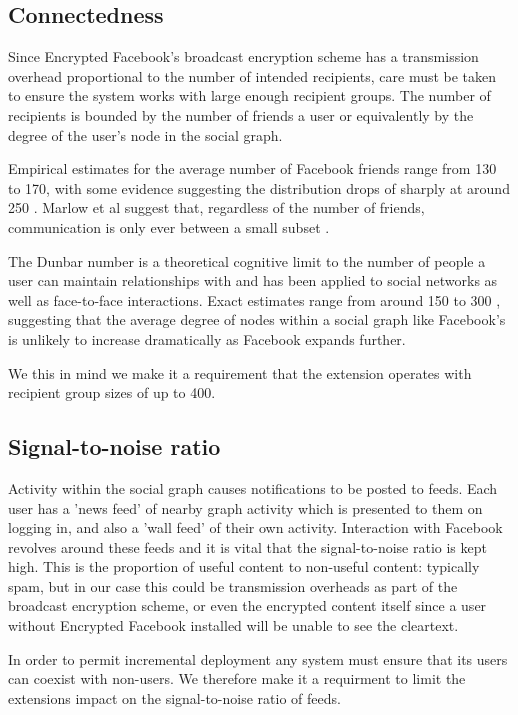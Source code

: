     
\FloatBarrier
\subsection{Connectedness}

Since Encrypted Facebook's broadcast encryption scheme has a transmission overhead proportional to the number of intended recipients, care must be taken to ensure the system works with large enough recipient groups. The number of recipients is bounded by the number of friends a user or equivalently by the degree of the user's node in the social graph. 

Empirical estimates for the average number of Facebook friends range from 130 to 170, with some evidence suggesting the distribution drops of sharply at around 250 \cite{fb-factsheet} \cite{fb-connectedness}. Marlow et al suggest that, regardless of the number of friends, communication is only ever between a small subset \cite{burke2010social}.

The Dunbar number is a theoretical cognitive limit to the number of people a user can maintain relationships with and has been applied to social networks as well as face-to-face interactions. Exact estimates range from around 150 to 300 \cite{xxx} \cite{xxx}, suggesting that the average degree of nodes within a social graph like Facebook's is unlikely to increase dramatically as Facebook expands further.

We this in mind we make it a requirement that the extension operates with recipient group sizes of up to 400.


\FloatBarrier
\subsection{Signal-to-noise ratio}

Activity within the social graph causes notifications to be posted to feeds. Each user has a 'news feed' of nearby graph activity which is presented to them on logging in, and also a 'wall feed' of their own activity. Interaction with Facebook revolves around these feeds and it is vital that the signal-to-noise ratio is kept high. This is the proportion of useful content to non-useful content: typically spam, but in our case this could be transmission overheads as part of the broadcast encryption scheme, or even the encrypted content itself since a user without Encrypted Facebook installed will be unable to see the cleartext.

In order to permit incremental deployment any system must ensure that its users can coexist with non-users. We therefore make it a requirment to limit the extensions impact on the signal-to-noise ratio of feeds.


